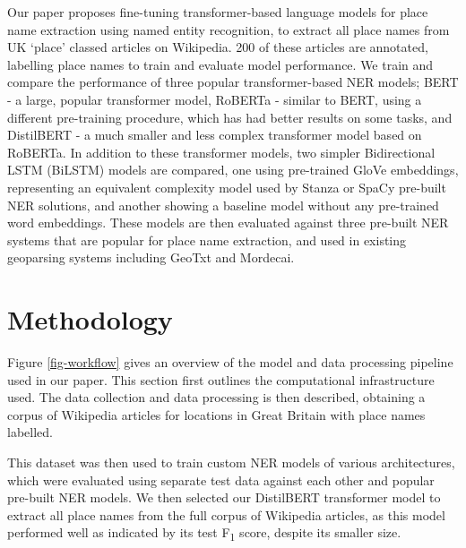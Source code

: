 \documentclass[
  letterpaper,
  11pt,
  english,
  onehalfspacing,
  headsepline]{MastersDoctoralThesis}
\begin{document}
Our paper proposes fine-tuning transformer-based language models for
place name extraction using named entity recognition, to extract all
place names from UK `place' classed articles on Wikipedia. 200 of these
articles are annotated, labelling place names to train and evaluate
model performance. We train and compare the performance of three popular
transformer-based NER models; BERT - a large, popular transformer model,
RoBERTa - similar to BERT, using a different pre-training procedure,
which has had better results on some tasks, and DistilBERT - a much
smaller and less complex transformer model based on RoBERTa. In addition
to these transformer models, two simpler Bidirectional LSTM (BiLSTM)
models are compared, one using pre-trained GloVe embeddings,
representing an equivalent complexity model used by Stanza or SpaCy
pre-built NER solutions, and another showing a baseline model without
any pre-trained word embeddings. These models are then evaluated against
three pre-built NER systems that are popular for place name extraction,
and used in existing geoparsing systems including GeoTxt and Mordecai.

\hypertarget{sec-trans-methodology}{%
\section{Methodology}\label{sec-trans-methodology}}

Figure \ref{fig-workflow} gives an overview of the model and data
processing pipeline used in our paper. This section first outlines the
computational infrastructure used. The data collection and data
processing is then described, obtaining a corpus of Wikipedia articles
for locations in Great Britain with place names labelled.

This dataset was then used to train custom NER models of various
architectures, which were evaluated using separate test data against
each other and popular pre-built NER models. We then selected our
DistilBERT transformer model to extract all place names from the full
corpus of Wikipedia articles, as this model performed well as indicated
by its test F\textsubscript{1} score, despite its smaller size.
\end{document}
